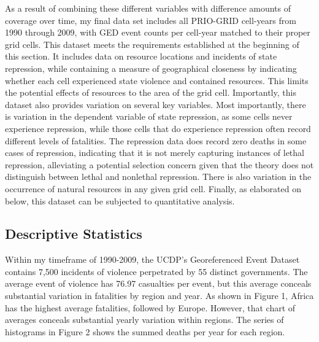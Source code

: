 As a result of combining these different variables with difference amounts of coverage over time, my final data set includes all PRIO-GRID cell-years from 1990 through 2009, with GED event counts per cell-year matched to their proper grid cells. This dataset meets the requirements established at the beginning of this section. It includes data on resource locations and incidents of state repression, while containing a measure of geographical closeness by indicating whether each cell experienced state violence and contained resources. This limits the potential effects of resources to the area of the grid cell. Importantly, this dataset also provides variation on several key variables. Most importantly, there is variation in the dependent variable of state repression, as some cells never experience repression, while those cells that do experience repression often record different levels of fatalities. The repression data does record zero deaths in some cases of repression, indicating that it is not merely capturing instances of lethal repression, alleviating a potential selection concern given that the theory does not distinguish between lethal and nonlethal repression. There is also variation in the occurrence of natural resources in any given grid cell. Finally, as elaborated on below, this dataset can be subjected to quantitative analysis.

\subsection*{Descriptive Statistics}
Within my timeframe of 1990-2009, the UCDP's Georeferenced Event Dataset \cite{SundbertMelander13} contains 7,500 incidents of violence perpetrated by 55 distinct governments. The average event of violence has 76.97 casualties per event, but this average conceals substantial variation in fatalities by region and year. As shown in Figure 1, Africa has the highest average fatalities, followed by Europe. However, that chart of averages conceals substantial yearly variation within regions. The series of histograms in Figure 2 shows the summed deaths per year for each region.

